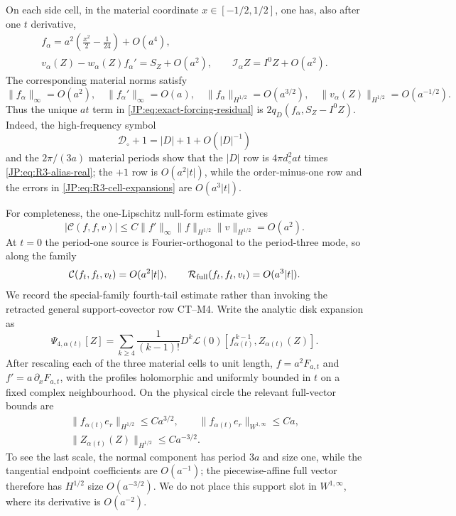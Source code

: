 \documentclass[11pt]{amsart}
\numberwithin{equation}{section}
\theoremstyle{definition}
\theoremstyle{remark}
\begin{document}
On each side cell, in the material coordinate
$x\in[-1/2,1/2]$, one has, also after one $t$ derivative,
\begin{equation}\label{JP:eq:R3-cell-expansions}
\begin{gathered}
 f_\alpha=a^2\left(\frac{x^2}{2}-\frac1{24}\right)+O(a^4),\\
 v_\alpha(Z)-w_\alpha(Z)f_\alpha'=S_Z+O(a^2),
 \qquad \mathcal I_\alpha Z=I^0Z+O(a^2).
\end{gathered}
\end{equation}
The corresponding material norms satisfy
\begin{equation}\label{JP:eq:R3-material-scales}
 \|f_\alpha\|_\infty=O(a^2),\quad
 \|f_\alpha'\|_\infty=O(a),\quad
 \|f_\alpha\|_{H^{1/2}}=O(a^{3/2}),\quad
 \|v_\alpha(Z)\|_{H^{1/2}}=O(a^{-1/2}).
\end{equation}
Thus the unique $at$ term in
\eqref{JP:eq:exact-forcing-residual} is
$2q_D(f_\alpha,S_Z-I^0Z)$.  Indeed, the high-frequency symbol
\[
 \mathcal D_\circ+1=|D|+1+O(|D|^{-1})
\]
and the $2\pi/(3a)$ material periods show that the $|D|$ row is
$4\pi d_\circ^2at$ times \eqref{JP:eq:R3-alias-real}; the $+1$ row is
$O(a^2|t|)$, while the order-minus-one row and the errors in
\eqref{JP:eq:R3-cell-expansions} are $O(a^3|t|)$.

For completeness, the one-Lipschitz null-form estimate gives
\[
 |\mathcal C(f,f,v)|
 \le C\|f'\|_\infty
       \|f\|_{H^{1/2}}\|v\|_{H^{1/2}}=O(a^2).
\]
At $t=0$ the period-one source is Fourier-orthogonal to the period-three
mode, so along the family
\begin{equation}\label{JP:eq:R3-lower-orders}
 \mathcal C(f_t,f_t,v_t)=O(a^2|t|),\qquad
 \mathcal R_{\rm full}(f_t,f_t,v_t)=O(a^3|t|).
\end{equation}
We record the special-family fourth-tail estimate rather than invoking
the retracted general support-covector row CT--M4.  Write the analytic
disk expansion as
\[
 \Psi_{4,\alpha(t)}[Z]
 =\sum_{k\ge4}\frac1{(k-1)!}
 D^k\mathcal L(0)
 [f_{\alpha(t)}^{\,k-1},Z_{\alpha(t)}(Z)].
\]
After rescaling each of the three material cells to unit length,
$f=a^2F_{a,t}$ and $f'=a\,\partial_xF_{a,t}$, with the profiles
holomorphic and uniformly bounded in $t$ on a fixed complex
neighbourhood.  On the
physical circle the relevant full-vector bounds are
\begin{equation}\label{JP:eq:R3-full-vector-scales}
\begin{gathered}
 \|f_{\alpha(t)}e_r\|_{H^{1/2}}\le Ca^{3/2},\qquad
 \|f_{\alpha(t)}e_r\|_{W^{1,\infty}}\le Ca,\\
 \|Z_{\alpha(t)}(Z)\|_{H^{1/2}}\le Ca^{-3/2}.
\end{gathered}
\end{equation}
To see the last scale, the normal component has period $3a$ and size one,
while the
tangential endpoint coefficients are $O(a^{-1})$; the piecewise-affine
full vector therefore has $H^{1/2}$ size $O(a^{-3/2})$.  We do not place
this support slot in $W^{1,\infty}$, where its derivative is
$O(a^{-2})$.
\end{document}
